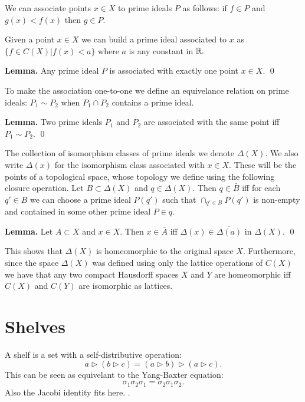\documentclass[11pt]{article}
\begin{document}
We can associate points $x\in X$ to prime ideals $P$ as follows:
if $f\in P$ and $g(x)< f(x)$ then $g\in P.$

Given a point $x\in X$ we can build a prime ideal associated to $x$
as $\{f\in C(X) | f(x)<a\}$ where $a$ is any constant in $\mathbb R.$

{\bf Lemma.} Any prime ideal $P$ is associated with exactly one point $x\in X.$
\qed

To make the association one-to-one we
define an equivelance relation on prime ideals:
$P_1\sim P_2$ when $P_1\cap P_2$ contains a prime ideal.

{\bf Lemma.} Two prime ideals $P_1$ and $P_2$ are associated with the same
point iff $P_1\sim P_2.$
\qed

The collection of isomorphism classes of prime ideals we denote $\Delta(X).$
We also write $\Delta(x)$ for the isomorphism class associated with $x\in X.$
These will be the points of a topological space, whose topology we
define using the following closure operation.
Let $B\subset\Delta(X)$ and $q\in\Delta(X).$
Then $q\in\bar{B}$ iff 
for each $q'\in B$
we can choose a prime ideal $P(q')$ such that
$\cap_{q'\in B} P(q')$ is non-empty and contained in some other prime ideal $P\in q.$

{\bf Lemma.} Let $A\subset X$ and $x\in X$. Then $x\in\bar{A}$ iff
$\Delta(x)\in\overline{\Delta(a)}$ in $\Delta(X).$
\qed

This shows that $\Delta(X)$ is homeomorphic to the original space $X.$
Furthermore, since the space $\Delta(X)$
was defined using only the lattice operations of $C(X)$ we have that
any two compact Hausdorff spaces $X$ and $Y$ are homeomorphic iff $C(X)$ and
$C(Y)$ are isomorphic as lattices.


\section{Shelves}

A shelf is a set with a self-distributive operation:
$$
a \triangleright (b \triangleright c) = (a\triangleright b)\triangleright(a\triangleright c).
$$
This can be seen as equivelant to the Yang-Baxter equation:
$$\sigma_1 \sigma_2 \sigma_1 = \sigma_2 \sigma_1 \sigma_2.$$
Also the Jacobi identity fits here.
\cite{Crans2004,Dehornoy2012}.
\end{document}

